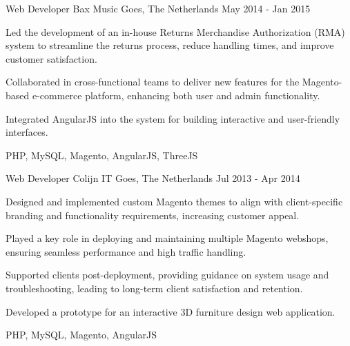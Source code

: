 \begin{cventries}
  \cventry
    {Web Developer} %
    {Bax Music} %
    {Goes, The Netherlands} %
    {May 2014 - Jan 2015} %
    {
      \begin{cvitems} %
        \item {Led the development of an in-house Returns Merchandise Authorization (RMA) system to streamline the returns process, reduce handling times, and improve customer satisfaction.}
        \item {Collaborated in cross-functional teams to deliver new features for the Magento-based e-commerce platform, enhancing both user and admin functionality.}
        \item {Integrated AngularJS into the system for building interactive and user-friendly interfaces.}
      \end{cvitems}
    }
    {PHP, MySQL, Magento, AngularJS, ThreeJS}

  \cventry
    {Web Developer} %
    {Colijn IT} %
    {Goes, The Netherlands} %
    {Jul 2013 - Apr 2014} %
    {
      \begin{cvitems} %
        \item {Designed and implemented custom Magento themes to align with client-specific branding and functionality requirements, increasing customer appeal.}
        \item {Played a key role in deploying and maintaining multiple Magento webshops, ensuring seamless performance and high traffic handling.  }
        \item {Supported clients post-deployment, providing guidance on system usage and troubleshooting, leading to long-term client satisfaction and retention.}
        \item {Developed a prototype for an interactive 3D furniture design web application.}
      \end{cvitems}
    }
    {PHP, MySQL, Magento, AngularJS}
\end{cventries}

